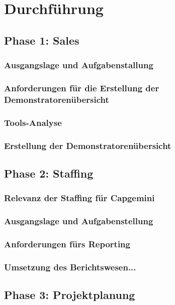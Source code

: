 \documentclass[a4paper, 12pt]{scrartcl}
\begin{document}
	\section{Durchführung}
	\subsection{Phase 1: Sales} 
	\subsubsection{Ausgangslage und Aufgabenstallung} %
	\subsubsection{Anforderungen für die Erstellung der Demonstratorenübersicht} %
	\subsubsection{Tools-Analyse}%
	\subsubsection{Erstellung der Demonstratorenübersicht}
	\newpage
	\subsection{Phase 2: Staffing}
	\subsubsection{Relevanz der Staffing für Capgemini}%
	\subsubsection{Ausgangslage und Aufgabenstellung}
	\subsubsection{Anforderungen fürs Reporting}
	\subsubsection{Umsetzung des Berichtswesen...}
	\newpage
	\subsection{Phase 3: Projektplanung}
	\newpage
\end{document}
